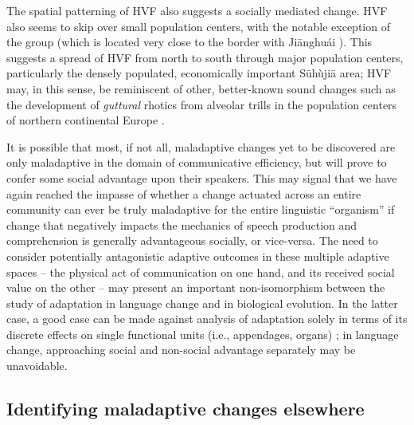 \documentclass[output=paper,hidelinks]{langscibook}
\begin{document}
The spatial patterning of HVF also suggests a socially mediated change. HVF also seems to skip over small population centers, with the notable exception of the  group (which is located very close to the border with Ji\={a}nghu\'{a}i ). This suggests a spread of HVF from north to south through major population centers, particularly the densely populated, economically important S\=uh\`uji\=a area; HVF may, in this sense, be reminiscent of other, better-known sound changes such as the development of \textit{guttural} rhotics from alveolar trills in the population centers of northern continental Europe \citep{trudgill}.


It is possible that most, if not all, maladaptive changes yet to be discovered are only maladaptive in the domain of communicative efficiency, but will prove to confer some social advantage upon their speakers.
%
%
This may signal that we have again reached the impasse of whether a change actuated across an entire community can ever be truly maladaptive for the entire linguistic ``organism'' if change that negatively impacts the mechanics of speech production and comprehension is generally advantageous socially, or vice-versa.
%
The need to consider potentially antagonistic adaptive outcomes in these multiple adaptive spaces -- the physical act of communication on one hand, and its received social value on the other -- may present an important non-isomorphism between the study of adaptation in language change and in  biological evolution.
%
In the latter case, a good case can be made against analysis of adaptation solely in terms of its discrete effects on single functional units (i.e., appendages, organs) \citep{gould-lewontin}; in language change, approaching social and non-social advantage separately may be unavoidable.


\subsection{Identifying maladaptive changes elsewhere}\label{sec:faytak:5.2}
\end{document}
